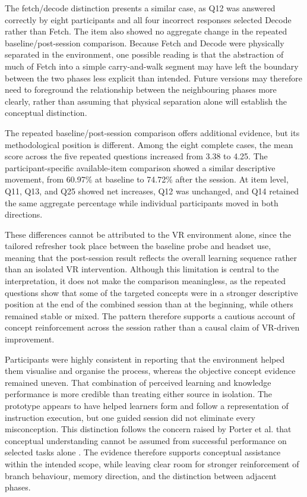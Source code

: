 The fetch/decode distinction presents a similar case, as Q12 was answered correctly by eight participants and all four incorrect responses selected Decode rather than Fetch. The item also showed no aggregate change in the repeated baseline/post-session comparison. Because Fetch and Decode were physically separated in the environment, one possible reading is that the abstraction of much of Fetch into a simple carry-and-walk segment may have left the boundary between the two phases less explicit than intended. Future versions may therefore need to foreground the relationship between the neighbouring phases more clearly, rather than assuming that physical separation alone will establish the conceptual distinction.

The repeated baseline/post-session comparison offers additional evidence, but its methodological position is different. Among the eight complete cases, the mean score across the five repeated questions increased from 3.38 to 4.25. The participant-specific available-item comparison showed a similar descriptive movement, from 60.97\% at baseline to 74.72\% after the session. At item level, Q11, Q13, and Q25 showed net increases, Q12 was unchanged, and Q14 retained the same aggregate percentage while individual participants moved in both directions.

These differences cannot be attributed to the VR environment alone, since the tailored refresher took place between the baseline probe and headset use, meaning that the post-session result reflects the overall learning sequence rather than an isolated VR intervention. Although this limitation is central to the interpretation, it does not make the comparison meaningless, as the repeated questions show that some of the targeted concepts were in a stronger descriptive position at the end of the combined session than at the beginning, while others remained stable or mixed. The pattern therefore supports a cautious account of concept reinforcement across the session rather than a causal claim of VR-driven improvement.

Participants were highly consistent in reporting that the environment helped them visualise and organise the process, whereas the objective concept evidence remained uneven. That combination of perceived learning and knowledge performance is more credible than treating either source in isolation. The prototype appears to have helped learners form and follow a representation of instruction execution, but one guided session did not eliminate every misconception. This distinction follows the concern raised by Porter et al. that conceptual understanding cannot be assumed from successful performance on selected tasks alone \cite{porter2013evaluating}. The evidence therefore supports conceptual assistance within the intended scope, while leaving clear room for stronger reinforcement of branch behaviour, memory direction, and the distinction between adjacent phases.


